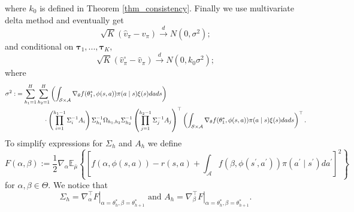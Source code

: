 \documentclass{article}
\numberwithin{equation}{section}
\theoremstyle{plain}
\theoremstyle{definition}
\theoremstyle{remark}
\begin{document}
where $k_0$ is defined in Theorem \ref{thm_consistency}. Finally we use multivariate delta method and eventually get
\begin{equation}\label{normal_result}
    \sqrt{K} \left(\widehat{v}_{\pi} - v_{\pi}\right) \stackrel{d}{\longrightarrow} N(0,\sigma^2);
\end{equation}
and conditional on $\boldsymbol{\tau}_1,...,\boldsymbol{\tau}_K,$
\begin{equation*}
    \sqrt{K} \left(\widehat{v}_{\pi}^{\circ} - \widehat{v}_{\pi}\right) \stackrel{d}{\longrightarrow} N(0,k_0 \sigma^2);
\end{equation*}
where
\begin{align*}
    \sigma^2 
    :&= \sum_{h_1=1}^H \sum_{h_2 = 1}^H \left(\int_{\mathcal{S} \times \mathcal{A}} \nabla_{\theta} f(\theta_1^*,\phi(s,a)) \pi(a \mid s) \xi(s) d a d s\right) \\
    & \hspace{10ex} \cdot \left(\prod_{i=1}^{h_1-1} \Sigma_i^{-1} A_i \right)\Sigma^{-1}_{h_1} \Omega_{h_1,h_2} \Sigma^{-1}_{h_2} \left(\prod_{j=1}^{h_2-1} \Sigma_j^{-1} A_j \right)^{\top} \left(\int_{\mathcal{S} \times \mathcal{A}} \nabla_{\theta} f(\theta_1^*,\phi(s,a)) \pi(a \mid s) \xi(s) d a d s\right)^{\top}.
\end{align*}
To simplify expressions for $\Sigma_h$ and $A_h$ we define
\begin{equation*}
    F(\alpha,\beta) := \frac{1}{2}\nabla_{\alpha} \mathbb{E}_{\bar{\mu}} \left\{\left[ f(\alpha,\phi(s,a)) - r(s,a) + \int_{\mathcal{A}} f(\beta,\phi(s^{\prime},a^{\prime})) \pi(a^{\prime}\mid s^{\prime}) d a^{\prime}\right]^2\right\}
\end{equation*}
for $\alpha,\beta \in \Theta.$ We notice that
\begin{equation*}
    \Sigma_h = \left.\nabla_{\alpha}^{\top} F \right|_{\alpha = \theta_h^*, \beta = \theta_{h+1}^*} \text{ and } A_h = \left.\nabla_{\beta}^{\top} F \right|_{\alpha = \theta_h^*, \beta = \theta_{h+1}^*}.
\end{equation*}
\end{document}
